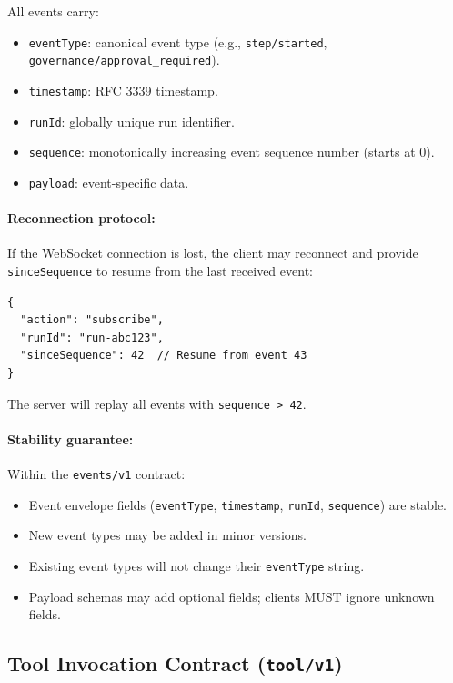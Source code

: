 All events carry:

\begin{itemize}
  \item \texttt{eventType}: canonical event type (e.g.,
        \texttt{step/started}, \texttt{governance/approval\_required}).
  \item \texttt{timestamp}: RFC 3339 timestamp.
  \item \texttt{runId}: globally unique run identifier.
  \item \texttt{sequence}: monotonically increasing event sequence number
        (starts at 0).
  \item \texttt{payload}: event-specific data.
\end{itemize}

\paragraph{Reconnection protocol:}

If the WebSocket connection is lost, the client may reconnect and provide
\texttt{sinceSequence} to resume from the last received event:

\begin{verbatim}
{
  "action": "subscribe",
  "runId": "run-abc123",
  "sinceSequence": 42  // Resume from event 43
}
\end{verbatim}

The server will replay all events with \texttt{sequence > 42}.

\paragraph{Stability guarantee:}

Within the \texttt{events/v1} contract:

\begin{itemize}
  \item Event envelope fields (\texttt{eventType}, \texttt{timestamp},
        \texttt{runId}, \texttt{sequence}) are stable.
  \item New event types may be added in minor versions.
  \item Existing event types will not change their \texttt{eventType} string.
  \item Payload schemas may add optional fields; clients MUST ignore unknown
        fields.
\end{itemize}

\subsection{Tool Invocation Contract (\texttt{tool/v1})}
\label{sec:tool-invocation-contract}

